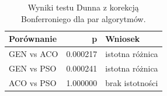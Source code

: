 \begin{table}
\caption{Wyniki testu Dunna z korekcją Bonferroniego dla par algorytmów.}
\label{tab:dunn_pairs}
\begin{tabular}{lrl}
\toprule
Porównanie & p & Wniosek \\
\midrule
GEN vs ACO & 0.000217 & istotna różnica \\
GEN vs PSO & 0.000241 & istotna różnica \\
ACO vs PSO & 1.000000 & brak istotności \\
\bottomrule
\end{tabular}
\end{table}
